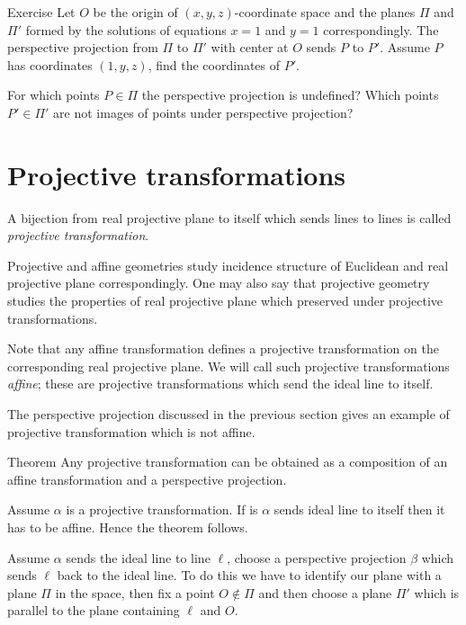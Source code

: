 \begin{thm}{Exercise}\label{ex:persect}
Let $O$ be the origin of $(x,y,z)$-coordinate space
and the planes $\Pi$ and $\Pi'$ formed by the solutions of equations
$x=1$ and $y=1$ correspondingly.
The perspective projection from $\Pi$ to $\Pi'$ with center at $O$ sends $P$ to $P'$.
Assume $P$ has coordinates $(1,y,z)$, find the coordinates of $P'$.

For which points $P\in \Pi$ the perspective projection is undefined?
Which points $P'\in\Pi'$ are not images of points under perspective projection?
\end{thm}

\section*{Projective transformations}

A bijection from real projective plane to itself 
which sends lines to lines 
is called \emph{projective transformation}.

Projective and affine geometries study incidence structure of Euclidean and real projective plane correspondingly.
One may also say that
projective geometry studies the properties of real projective plane which preserved under projective transformations.


Note that any affine transformation defines  a projective transformation on the corresponding real projective plane.
We will call such projective transformations \emph{affine}; 
these are projective transformations which send the ideal line to itself.

The perspective projection discussed in the previous section 
gives an example of projective transformation which is not affine.

\begin{thm}{Theorem}
Any projective transformation can be obtained as a composition of an affine transformation and a perspective projection.
\end{thm}

Assume $\alpha$ is a projective transformation. 
If is $\alpha$ sends ideal line to itself then it has to be affine. 
Hence the theorem follows.

Assume $\alpha$ sends the ideal line to line $\ell$, choose a perspective projection $\beta$ which sends $\ell$ back to the ideal line.
To do this we have to identify our plane with a plane $\Pi$ in the space, 
then fix a point $O\notin \Pi$  
and then choose a plane $\Pi'$ which is
parallel to the plane containing $\ell$ and $O$.

